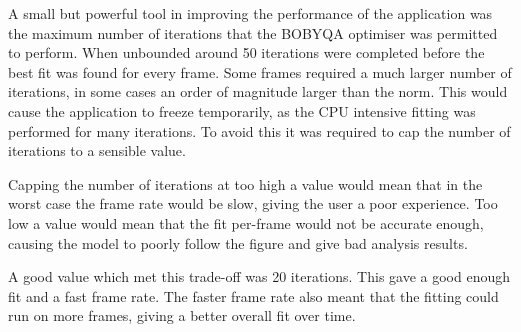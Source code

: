 A small but powerful tool in improving the performance of the application was the maximum number of iterations that the BOBYQA optimiser was permitted to perform. When unbounded around 50 iterations were completed before the best fit was found for every frame. Some frames required a much larger number of iterations, in some cases an order of magnitude larger than the norm. This would cause the application to freeze temporarily, as the CPU intensive fitting was performed for many iterations. To avoid this it was required to cap the number of iterations to a sensible value.

Capping the number of iterations at too high a value would mean that in the worst case the frame rate would be slow, giving the user a poor experience. Too low a value would mean that the fit per-frame would not be accurate enough, causing the model to poorly follow the figure and give bad analysis results.

A good value which met this trade-off was 20 iterations. This gave a good enough fit and a fast frame rate. The faster frame rate also meant that the fitting could run on more frames, giving a better overall fit over time.